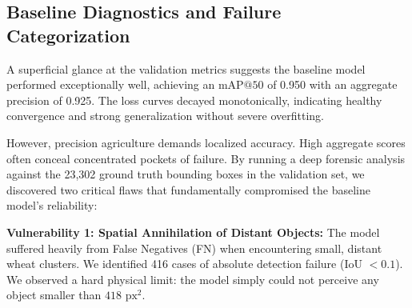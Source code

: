 \begin{table}[h]
\centering
\caption{Control Group: Default YOLOv8s Configuration}
\label{tab:baseline_hyperparams}
\end{table}

\subsection{Baseline Diagnostics and Failure Categorization}
\label{subsec:error_analysis}

A superficial glance at the validation metrics suggests the baseline model performed exceptionally well, achieving an $\text{mAP@50}$ of 0.950 with an aggregate precision of 0.925. The loss curves decayed monotonically, indicating healthy convergence and strong generalization without severe overfitting.

However, precision agriculture demands localized accuracy. High aggregate scores often conceal concentrated pockets of failure. By running a deep forensic analysis against the 23,302 ground truth bounding boxes in the validation set, we discovered two critical flaws that fundamentally compromised the baseline model's reliability:

\textbf{Vulnerability 1: Spatial Annihilation of Distant Objects:} The model suffered heavily from False Negatives (FN) when encountering small, distant wheat clusters. We identified 416 cases of absolute detection failure (IoU $< 0.1$). We observed a hard physical limit: the model simply could not perceive any object smaller than $418 \text{ px}^2$.


